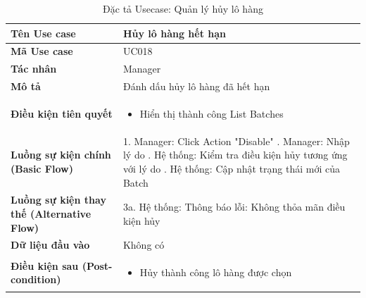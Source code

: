 \documentclass[12pt,a4paper]{report}
\begin{document}
\begin{longtable}{|>{\raggedright\arraybackslash\bfseries}p{4.5cm}|p{11cm}|}
\caption{Đặc tả Usecase: Quản lý hủy lô hàng} \label{tab:uc_cancel_batch} \\
\hline
Tên Use case & Hủy lô hàng hết hạn \\ \hline
Mã Use case & UC018 \\ \hline
Tác nhân & Manager \\ \hline
Mô tả & Đánh dấu hủy lô hàng đã hết hạn \\ \hline
Điều kiện tiên quyết & 
\begin{itemize}[leftmargin=*, nosep, topsep=0pt, partopsep=0pt]
    \item Hiển thị thành công List Batches
\end{itemize} \\ \hline
Luồng sự kiện chính (Basic Flow) & 
1. Manager: Click Action "Disable" \newline
2. Manager: Nhập lý do \newline
3. Hệ thống: Kiểm tra điều kiện hủy tương ứng với lý do \newline
4. Hệ thống: Cập nhật trạng thái mới của Batch \\ \hline
Luồng sự kiện thay thế (Alternative Flow) & 
3a. Hệ thống: Thông báo lỗi: Không thỏa mãn điều kiện hủy \\ \hline
Dữ liệu đầu vào & Không có \\ \hline
Điều kiện sau (Post-condition) & 
\begin{itemize}[leftmargin=*, nosep, topsep=0pt, partopsep=0pt]
    \item Hủy thành công lô hàng được chọn
\end{itemize} \\ \hline
\end{longtable}

\vspace{0.5cm}
\end{document}
